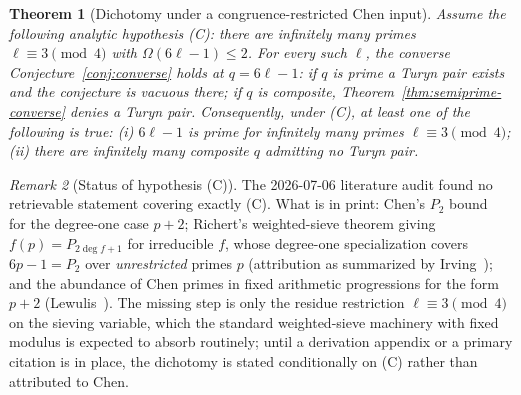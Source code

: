 \documentclass[11pt]{article}
\theoremstyle{plain}
\newtheorem{theorem}{Theorem}[section]
\theoremstyle{definition}
\theoremstyle{remark}
\newtheorem{remark}[theorem]{Remark}
\begin{document}
\begin{theorem}[Dichotomy under a congruence-restricted Chen
input]\label{thm:chen-dichotomy}
Assume the following analytic hypothesis \textup{(C)}: there are
infinitely many primes $\ell\equiv3\pmod4$ with
$\Omega(6\ell-1)\le2$.  For every such $\ell$, the converse
Conjecture~\ref{conj:converse} holds at $q=6\ell-1$: if $q$ is prime a
Turyn pair exists and the conjecture is vacuous there; if $q$ is
composite, Theorem~\ref{thm:semiprime-converse} denies a Turyn pair.
Consequently, under \textup{(C)}, at least one of the following is
true:
(i) $6\ell-1$ is prime for infinitely many primes $\ell\equiv3\pmod4$;
(ii) there are infinitely many composite $q$ admitting no Turyn pair.
\end{theorem}

\begin{remark}[Status of hypothesis (C)]\label{rem:chen-input}
The 2026-07-06 literature audit found no retrievable statement covering
exactly \textup{(C)}.  What is in print: Chen's $P_2$ bound~\cite{Chen73} for the
degree-one case $p+2$; Richert's weighted-sieve theorem giving
$f(p)=P_{2\deg f+1}$ for irreducible $f$, whose degree-one
specialization covers $6p-1=P_2$ over \emph{unrestricted} primes $p$
(attribution as summarized by Irving~\cite{Irving14}); and the abundance of Chen
primes in fixed arithmetic progressions for the form $p+2$ (Lewulis~\cite{Lewulis16}).
The missing step is only the residue restriction
$\ell\equiv3\pmod4$ on the sieving variable, which the standard
weighted-sieve machinery with fixed modulus is expected to absorb
routinely; until a derivation appendix or a primary citation is in
place, the dichotomy is stated conditionally on \textup{(C)} rather
than attributed to Chen.
\end{remark}
\end{document}

